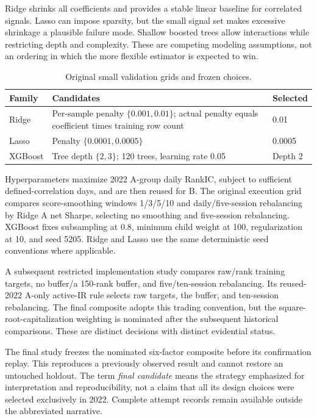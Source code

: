 \documentclass[11pt]{article}
\begin{document}
Ridge shrinks all coefficients and provides a stable linear baseline for correlated signals. Lasso can impose sparsity, but the small signal set makes excessive shrinkage a plausible failure mode. Shallow boosted trees allow interactions while restricting depth and complexity. These are competing modeling assumptions, not an ordering in which the more flexible estimator is expected to win.

\begin{table}[H]\centering\small\caption{Original small validation grids and frozen choices.}\label{tab:parameters}
\begin{tabularx}{\textwidth}{l X l}\toprule Family & Candidates & Selected\\\midrule
Ridge & Per-sample penalty $\{0.001,0.01\}$; actual penalty equals coefficient times training row count & 0.01\\
Lasso & Penalty $\{0.0001,0.0005\}$ & 0.0005\\
XGBoost & Tree depth $\{2,3\}$; 120 trees, learning rate 0.05 & Depth 2\\\bottomrule
\end{tabularx}\end{table}

Hyperparameters maximize 2022 A-group daily RankIC, subject to sufficient defined-correlation days, and are then reused for B. The original execution grid compares score-smoothing windows 1/3/5/10 and daily/five-session rebalancing by Ridge A net Sharpe, selecting no smoothing and five-session rebalancing. XGBoost fixes subsampling at 0.8, minimum child weight at 100, regularization at 10, and seed 5205. Ridge and Lasso use the same deterministic seed conventions where applicable.

A subsequent restricted implementation study compares raw/rank training targets, no buffer/a 150-rank buffer, and five/ten-session rebalancing. Its reused-2022 A-only active-IR rule selects raw targets, the buffer, and ten-session rebalancing. The final composite adopts this trading convention, but the square-root-capitalization weighting is nominated after the subsequent historical comparisons. These are distinct decisions with distinct evidential status.

The final study freezes the nominated six-factor composite before its confirmation replay. This reproduces a previously observed result and cannot restore an untouched holdout. The term \emph{final candidate} means the strategy emphasized for interpretation and reproducibility, not a claim that all its design choices were selected exclusively in 2022. Complete attempt records remain available outside the abbreviated narrative.
\clearpage
\end{document}
